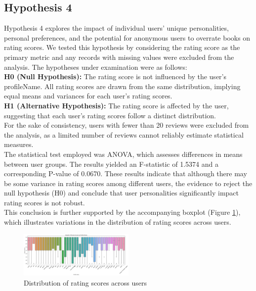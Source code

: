 \subsection*{Hypothesis 4}
Hypothesis 4 explores the impact of individual users' unique personalities, personal preferences,
and the potential for anonymous users to overrate books on rating scores.
We tested this hypothesis by considering the rating score as the primary metric and
any records with missing values were excluded from the analysis.
The hypotheses under examination were as follows:\\
\textbf{H0 (Null Hypothesis):} The rating score is not influenced by the user's profileName.
All rating scores are drawn from the same distribution, implying equal means and variances for each user's rating scores.\\
\textbf{H1 (Alternative Hypothesis):} The rating score is affected by the user,
suggesting that each user's rating scores follow a distinct distribution.\\
For the sake of consistency, users with fewer than 20 reviews were excluded from the analysis,
as a limited number of reviews cannot reliably estimate statistical measures.\\
The statistical test employed was ANOVA, which assesses differences in means between user groups.
The results yielded an F-statistic of 1.5374 and a corresponding P-value of 0.0670.
These results indicate that although there may be some variance in rating scores among different users,
the evidence to reject the null hypothesis (H0) and conclude that user personalities significantly impact
rating scores is not robust.\\
This conclusion is further supported by the accompanying boxplot (Figure \ref{fig:h4}),
which illustrates variations in the distribution of rating scores across users.
\begin{figure}[H]
    \centering
    \includegraphics[width=0.5\textwidth]{./figures/h4.1.png}
    \caption{Distribution of rating scores across users}
    \label{fig:h4}
\end{figure}
